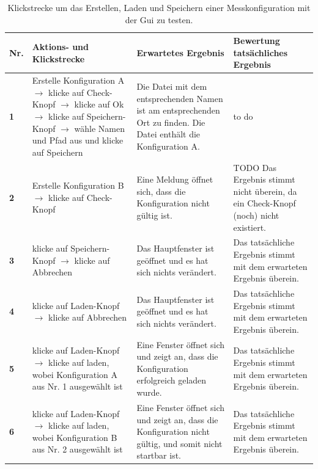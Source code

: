 \documentclass[parskip=full]{scrartcl}
\begin{document}
\begin{table}[h]
\begin{tabular}{| p{} | p{} | p{} | p{} |}
	\hline
	\textbf{Nr.} & \textbf{Aktions- und Klickstrecke} & \textbf{Erwartetes Ergebnis}  & \textbf{ Bewertung tatsächliches Ergebnis} \\ \hline
	\textbf{1}
	& 
	Erstelle Konfiguration A $\rightarrow$ klicke auf Check-Knopf $\rightarrow$ klicke auf Ok $\rightarrow$ klicke auf Speichern-Knopf $\rightarrow$ wähle Namen und Pfad aus und klicke auf Speichern 
	&
	Die Datei mit dem entsprechenden Namen ist am entsprechenden Ort zu finden. Die Datei enthält die Konfiguration A.
	& 
	to do
	\\ \hline
	
	\textbf{2}
	& 
	Erstelle Konfiguration B $\rightarrow$ klicke auf Check-Knopf
	&
	Eine Meldung öffnet sich, dass die Konfiguration nicht gültig ist.
	& 
	 TODO Das Ergebnis stimmt nicht überein, da ein Check-Knopf (noch) nicht existiert.
	\\ \hline
	
	\textbf{3}
	& 
	klicke auf Speichern-Knopf $\rightarrow$ klicke auf Abbrechen
	&
	Das Hauptfenster ist geöffnet und es hat sich nichts verändert.
	& 
	Das tatsächliche Ergebnis stimmt mit dem erwarteten Ergebnis überein.
	\\ \hline
	
	\textbf{4}
	& 
	klicke auf Laden-Knopf $\rightarrow$ klicke auf Abbrechen
	&
	Das Hauptfenster ist geöffnet und es hat sich nichts verändert.
	& 
	Das tatsächliche Ergebnis stimmt mit dem erwarteten Ergebnis überein.
	\\ \hline
	
	\textbf{5}
	& 
	klicke auf Laden-Knopf $\rightarrow$ klicke auf laden, wobei Konfiguration A aus Nr. 1 ausgewählt ist
	&
	Eine Fenster öffnet sich und zeigt an, dass die Konfiguration erfolgreich geladen wurde.
	& 
	Das tatsächliche Ergebnis stimmt mit dem erwarteten Ergebnis überein.
	\\ \hline
	\textbf{6}
	& 
	klicke auf Laden-Knopf $\rightarrow$ klicke auf laden, wobei Konfiguration B aus Nr. 2 ausgewählt ist
	&
	Eine Fenster öffnet sich und zeigt an, dass die Konfiguration nicht gültig, und somit nicht startbar ist.
	& 
	Das tatsächliche Ergebnis stimmt mit dem erwarteten Ergebnis überein.
	\\ \hline
		
	
	
\end{tabular}

\caption{Klickstrecke um das Erstellen, Laden und Speichern einer Messkonfiguration mit der Gui zu testen.}
\label{klickConfig}
\end{table}
\end{document}
